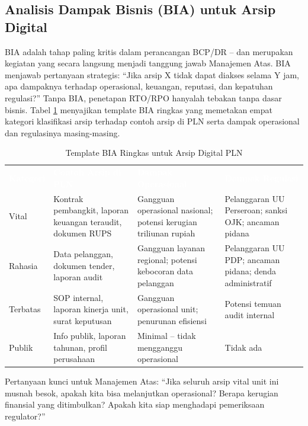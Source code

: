 \documentclass[12pt,a4paper]{report}
\begin{document}
\subsection{Analisis Dampak Bisnis (BIA) untuk Arsip Digital}
BIA adalah tahap paling kritis dalam perancangan BCP/DR -- dan merupakan kegiatan yang secara langsung menjadi tanggung jawab Manajemen Atas. BIA menjawab pertanyaan strategis: ``Jika arsip X tidak dapat diakses selama Y jam, apa dampaknya terhadap operasional, keuangan, reputasi, dan kepatuhan regulasi?'' Tanpa BIA, penetapan RTO/RPO hanyalah tebakan tanpa dasar bisnis. Tabel \ref{tab:bia} menyajikan template BIA ringkas yang memetakan empat kategori klasifikasi arsip terhadap contoh arsip di PLN serta dampak operasional dan regulasinya masing-masing.

\begin{table}[htbp]
\centering
\small
\caption{Template BIA Ringkas untuk Arsip Digital PLN}
\label{tab:bia}
\renewcommand{\arraystretch}{1.6}
\begin{tabularx}{\textwidth}{@{} >{\raggedright\arraybackslash}p{1.5cm} X X X @{}}
\rowcolor{rowhead}
\textcolor{white}{\textbf{Kategori}} & \textcolor{white}{\textbf{Contoh Arsip di PLN}} & \textcolor{white}{\textbf{Dampak Operasional}} & \textcolor{white}{\textbf{Dampak Regulasi}} \\
\rowcolor{rowalt}
Vital & Kontrak pembangkit, laporan keuangan teraudit, dokumen RUPS & Gangguan operasional nasional; potensi kerugian triliunan rupiah & Pelanggaran UU Perseroan; sanksi OJK; ancaman pidana \\
\rowcolor{white}
Rahasia & Data pelanggan, dokumen tender, laporan audit & Gangguan layanan regional; potensi kebocoran data pelanggan & Pelanggaran UU PDP; ancaman pidana; denda administratif \\
\rowcolor{rowalt}
Terbatas & SOP internal, laporan kinerja unit, surat keputusan & Gangguan operasional unit; penurunan efisiensi & Potensi temuan audit internal \\
\rowcolor{white}
Publik & Info publik, laporan tahunan, profil perusahaan & Minimal -- tidak mengganggu operasional & Tidak ada \\
\bottomrule
\end{tabularx}
\end{table}

Pertanyaan kunci untuk Manajemen Atas: ``Jika seluruh arsip vital unit ini musnah besok, apakah kita bisa melanjutkan operasional? Berapa kerugian finansial yang ditimbulkan? Apakah kita siap menghadapi pemeriksaan regulator?''
\end{document}
